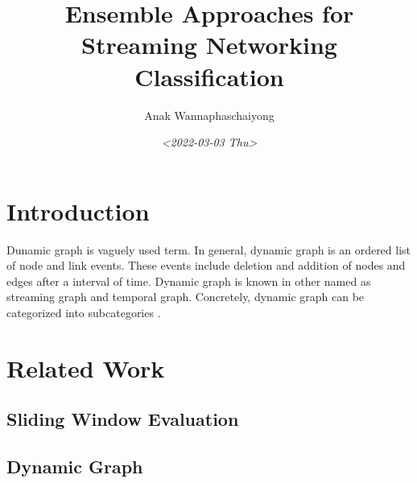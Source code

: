\documentclass{IEEEtran}
\author{Anak Wannaphaschaiyong}
\date{\textit{<2022-03-03 Thu>}}
\title{Ensemble Approaches for Streaming Networking Classification}
\begin{document}
\maketitle

\section{Introduction}
\label{sec:orgf2acddc}
Dunamic graph is vaguely used term. In general, dynamic graph is an ordered list of node and link events. These events include deletion and addition of nodes and edges after a interval of time.
Dynamic graph is known in other named as streaming graph and temporal graph. Concretely, dynamic graph can be categorized into subcategories \cite{barrosSurveyEmbeddingDynamic2021,kazemiRepresentationLearningDynamica,skardingFoundationsModelingDynamic2021}.

\section{Related Work}
\label{sec:orgc29b800}
\subsection{Sliding Window Evaluation}
\label{sec:org5d490fc}
\subsection{Dynamic Graph}
\label{sec:org7e4a7f1}



\end{document}
